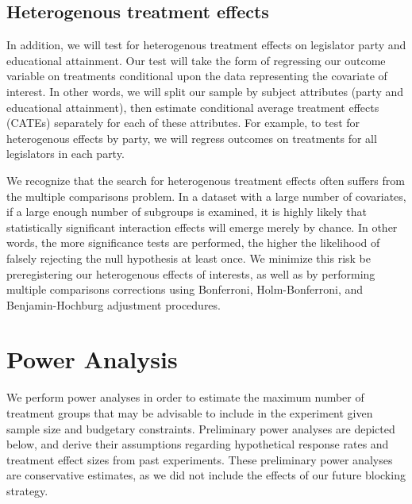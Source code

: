 \documentclass[12pt,final,fleqn]{article}
\theoremstyle{plain}
\begin{document}
\subsection{Heterogenous treatment effects} \label{sec: hte}


In addition, we will test for heterogenous treatment effects on legislator party and educational attainment. Our test will take the form of regressing our outcome variable on treatments conditional upon the data representing the covariate of interest. In other words, we will split our sample by subject attributes (party and educational attainment), then estimate conditional average treatment effects (CATEs) separately for each of these attributes. For example, to test for heterogenous effects by party, we will regress outcomes on treatments for all legislators in each party.

We recognize that the search for heterogenous treatment effects often suffers from the multiple comparisons problem. In a dataset with a large number of covariates, if a large enough number of subgroups is examined, it is highly likely that statistically significant interaction effects will emerge merely by chance. In other words, the more significance tests are performed, the higher the likelihood of falsely rejecting the null hypothesis at least once. We minimize this risk be preregistering our heterogenous effects of interests, as well as by performing multiple comparisons corrections using Bonferroni, Holm-Bonferroni, and Benjamin-Hochburg adjustment procedures.


\section{Power Analysis} \label{sec:Power}

We perform power analyses in order to estimate the maximum number of treatment groups that may be advisable to include in the experiment given sample size and budgetary constraints. Preliminary power analyses are depicted below, and derive their assumptions regarding hypothetical response rates and treatment effect sizes from past experiments. These preliminary power analyses are conservative estimates, as we did not include the effects of our future blocking strategy.
\end{document}
